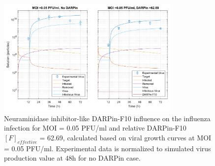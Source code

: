 \begin{figure}
\begin{center}
\includegraphics[width=0.8\textwidth, trim={0cm 0cm 0cm 0cm}, clip]{D_chapters/3_DARPinModels/2_DARPinProduction/comparisonModelTHillIRVViDelayMOI0.072135DARPin62.6898AsymmetricDarpinMyosinInhibitor.pdf}
\caption[Neuraminidase inhibitor-like DARPin-F10 for MOI = 0.05 PFU/ml and $F_{effective}$ = 62.69]{Neuraminidase inhibitor-like DARPin-F10 influence on the influenza infection for MOI = 0.05 PFU/ml and relative DARPin-F10 $[F]_{effective}$ = 62.69, calculated based on viral growth curves at MOI = 0.05 PFU/ml. Experimental data is normalized to simulated virus production value at 48h for no DARPin case.}
\label{figure:neuraminidaseInhibitorLikeF62}
\end{center}
\end{figure}